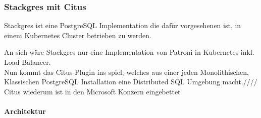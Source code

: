 \subsubsection{Stackgres mit Citus}
\begin{flushleft} 
Stackgres ist eine PostgreSQL Implementation die dafür vorgesehenen ist, in einem Kubernetes Cluster betrieben zu werden.
\end{flushleft} 
\begin{flushleft}
An sich wäre Stackgres nur eine Implementation von Patroni in Kubernetes inkl. Load Balancer.\\
Nun kommt das Citus-Plugin ins spiel, welches aus einer jeden Monolithischen, Klassischen PostgreSQL Installation eine Distributed SQL Umgebung macht.////
Citus wiederum ist in den Microsoft Konzern eingebettet
\end{flushleft}

\paragraph{Architektur}
\paragraph{}